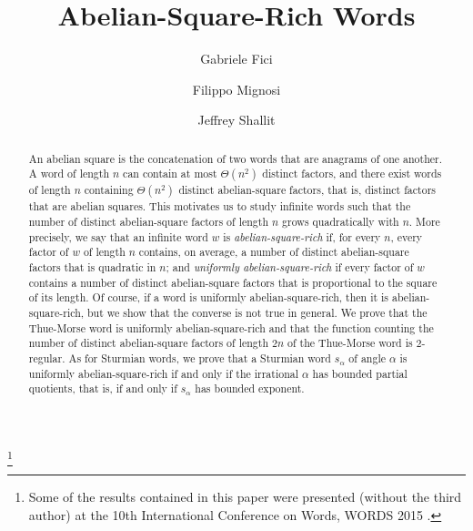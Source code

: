 \documentclass[11pt,reqno]{amsart}
\numberwithin{equation}{section}
\theoremstyle{plain}
\theoremstyle{definition}
\theoremstyle{remark}
\begin{document}
\sloppy

\setcounter{page}{1}

\title[Abelian-Square-Rich Words]{Abelian-Square-Rich Words}

\author[G. Fici]{Gabriele Fici}
\address[G. Fici]{Dipartimento di Matematica e Informatica\\
                Universit\`a di Palermo\\
                Palermo, Italy}
\thanks{Some of the results contained in this paper were presented 
(without the third author) at the 10th International Conference on Words, WORDS 2015 \cite{FiMi15}.}

\author[F. Mignosi]{Filippo Mignosi}
\address[F. Mignosi]{Dipartimento di Ingegneria e Scienze dell'Informazione e Matematica\\ Universit\`a dell'Aquila\\ 
   L'Aquila, Italy}

\author[J. Shallit]{Jeffrey Shallit}
\address[J. Shallit]{School of Computer Science, University of Waterloo\\ 
   Waterloo, ON N2L 3G1, Canada}
   
\begin{abstract}
An abelian square is the concatenation of two words that are anagrams of one another. A word of length $n$ can contain at most $\Theta(n^2)$ distinct factors, and there exist words of length $n$ containing $\Theta(n^2)$ distinct abelian-square factors, that is, distinct factors that are abelian squares. This motivates us to study infinite words such that the number of distinct abelian-square factors of length $n$ grows quadratically with $n$. More precisely, we say that an infinite word $w$ is {\it abelian-square-rich} if, for every $n$, every factor of $w$ of length $n$ contains, on average, a number of distinct abelian-square factors that is quadratic in $n$; and {\it uniformly abelian-square-rich} if every factor of $w$ contains a number of distinct abelian-square factors that is proportional to the square of its length. Of course, if a word is uniformly abelian-square-rich, then it is abelian-square-rich, but we show that the converse is not true in general.
We prove that the Thue-Morse word is uniformly abelian-square-rich and that the function counting the number of distinct abelian-square factors of length $2n$ of the Thue-Morse word is $2$-regular. As for Sturmian words, we prove that a Sturmian word $s_{\alpha}$ of angle $\alpha$ is uniformly abelian-square-rich if and only if the irrational $\alpha$ has bounded partial quotients, that is, if and only if $s_{\alpha}$ has bounded exponent. 
\end{abstract}
\end{document}

